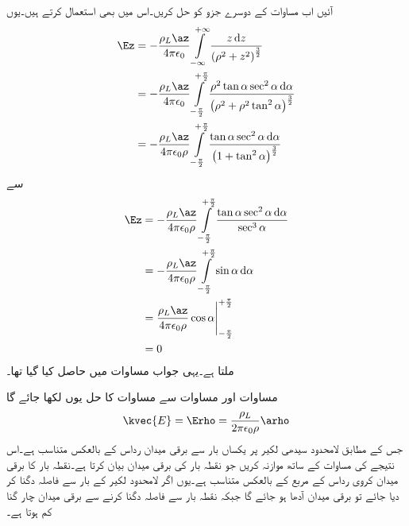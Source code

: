 آئیں اب مساوات  کے   دوسرے جزو کو حل کریں۔اس میں بھی  استعمال کرتے ہیں۔یوں
\begin{align*}
\Ez&=-\frac{\rho_L \az}{4 \pi \epsilon_0}\int\limits_{-\infty}^{+\infty} \frac{z \dif z}{\left(\rho^2+z^2 \right)^{\frac{3}{2}}}\\
&=-\frac{\rho_L \az}{4 \pi \epsilon_0}\int\limits_{-\frac{\pi}{2}}^{+\frac{\pi}{2}} \frac{\rho^2 \tan \alpha  \sec^2 \alpha \dif \alpha}{\left(\rho^2+\rho^2 \tan^2 \alpha \right)^{\frac{3}{2}}}\\
&=-\frac{\rho_L \az}{4 \pi \epsilon_0 \rho}\int\limits_{-\frac{\pi}{2}}^{+\frac{\pi}{2}} \frac{ \tan \alpha  \sec^2 \alpha \dif \alpha}{\left(1+ \tan^2 \alpha \right)^{\frac{3}{2}}}
\end{align*}
سے
\begin{gather}
\begin{aligned}\label{مساوات_کولمب_لامحدود_لکیر_عمودی_میدان}
\Ez&=-\frac{\rho_L \az}{4 \pi \epsilon_0 \rho}\int\limits_{-\frac{\pi}{2}}^{+\frac{\pi}{2}} \frac{ \tan \alpha  \sec^2 \alpha \dif \alpha}{\sec^3 \alpha}\\
&=-\frac{\rho_L \az}{4 \pi \epsilon_0 \rho}\int\limits_{-\frac{\pi}{2}}^{+\frac{\pi}{2}} \sin \alpha \dif \alpha\\
&=\frac{\rho_L \az}{4 \pi \epsilon_0 \rho} \eval{\cos \alpha}_{-\frac{\pi}{2}}^{+\frac{\pi}{2}}\\
&=0
\end{aligned}
\end{gather}
ملتا ہے۔یہی جواب مساوات  میں حاصل کیا گیا تھا۔

مساوات  اور مساوات  سے مساوات   کا حل یوں لکھا جائے گا
\begin{align}\label{مساوات_کولمب_لامحدود_لکیر_رداسی_میدان_پیدا_کرتا_ہے}
\kvec{E}=\Erho=\frac{\rho_L }{2 \pi \epsilon_0 \rho} \arho
\end{align}
جس کے مطابق لامحدود سیدھی لکیر پر یکساں بار سے برقی میدان رداس   کے بالعکس متناسب ہے۔اس نتیجے  کی مساوات  کے ساتھ موازنہ کریں جو نقطہ بار کی برقی میدان بیان کرتا ہے۔نقطہ بار کا برقی میدان کروی رداس کے مربع کے بالعکس متناسب ہے۔یوں اگر لامحدود لکیر کے بار سے فاصلہ دگنا کر دیا جائے تو برقی میدان آدھا ہو جائے گا جبکہ نقطہ بار سے فاصلہ دگنا کرنے سے برقی میدان چار گنا کم ہوتا ہے۔

